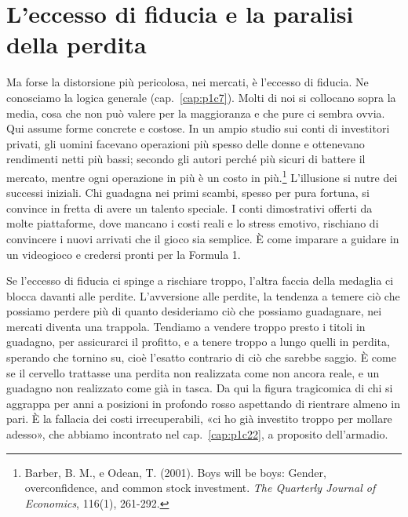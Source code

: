 \section{L'eccesso di fiducia e la paralisi della perdita}

Ma forse la distorsione pi\`{u} pericolosa, nei mercati, \`{e} l'eccesso di fiducia. Ne conosciamo la logica generale (cap.~\ref{cap:p1c7}). Molti di noi si collocano sopra la media, cosa che non pu\`{o} valere per la maggioranza e che pure ci sembra ovvia. Qui assume forme concrete e costose. In un ampio studio sui conti di investitori privati, gli uomini facevano operazioni pi\`{u} spesso delle donne e ottenevano rendimenti netti pi\`{u} bassi; secondo gli autori perch\'{e} pi\`{u} sicuri di battere il mercato, mentre ogni operazione in pi\`{u} \`{e} un costo in pi\`{u}.\footnote{Barber, B. M., e Odean, T. (2001). Boys will be boys: Gender, overconfidence, and common stock investment. \textit{The Quarterly Journal of Economics}, 116(1), 261-292.} L'illusione si nutre dei successi iniziali. Chi guadagna nei primi scambi, spesso per pura fortuna, si convince in fretta di avere un talento speciale. I conti dimostrativi offerti da molte piattaforme, dove mancano i costi reali e lo stress emotivo, rischiano di convincere i nuovi arrivati che il gioco sia semplice. \`{E} come imparare a guidare in un videogioco e credersi pronti per la Formula 1.

Se l'eccesso di fiducia ci spinge a rischiare troppo, l'altra faccia della medaglia ci blocca davanti alle perdite. L'avversione alle perdite, la tendenza a temere ci\`{o} che possiamo perdere pi\`{u} di quanto desideriamo ci\`{o} che possiamo guadagnare, nei mercati diventa una trappola. Tendiamo a vendere troppo presto i titoli in guadagno, per assicurarci il profitto, e a tenere troppo a lungo quelli in perdita, sperando che tornino su, cio\`{e} l'esatto contrario di ci\`{o} che sarebbe saggio. \`{E} come se il cervello trattasse una perdita non realizzata come non ancora reale, e un guadagno non realizzato come gi\`{a} in tasca. Da qui la figura tragicomica di chi si aggrappa per anni a posizioni in profondo rosso aspettando di rientrare almeno in pari. \`{E} la fallacia dei costi irrecuperabili, «ci ho gi\`{a} investito troppo per mollare adesso», che abbiamo incontrato nel cap.~\ref{cap:p1c22}, a proposito dell'armadio.

